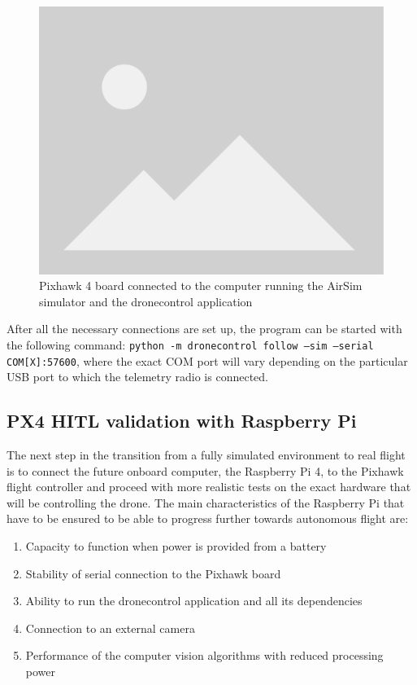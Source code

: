 \begin{figure}
  \centering
  \includegraphics[width=.6\textwidth, keepaspectratio]{img/placeholder.png}
  \caption{Pixhawk 4 board connected to the computer running the AirSim simulator and the dronecontrol application}
  \label{fig:hitl-setup-picture}
\end{figure}

After all the necessary connections are set up, the program can be started with the following command:
\texttt{python -m dronecontrol follow --sim --serial COM[X]:57600}, where the exact COM port will vary depending on the particular USB port to which the telemetry radio is connected.


\subsection{PX4 HITL validation with Raspberry Pi}
\label{sec:test-5-rpi}


The next step in the transition from a fully simulated environment to real flight is to connect the future onboard computer, the Raspberry Pi 4, to the Pixhawk flight controller and proceed with more realistic tests on the exact hardware that will be controlling the drone.
The main characteristics of the Raspberry Pi that have to be ensured to be able to progress further towards autonomous flight are:
\begin{enumerate}
    \item Capacity to function when power is provided from a battery
    \item Stability of serial connection to the Pixhawk board
    \item Ability to run the dronecontrol application and all its dependencies
    \item Connection to an external camera
    \item Performance of the computer vision algorithms with reduced processing power
\end{enumerate}

